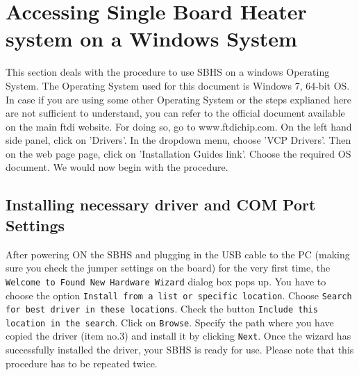 \documentclass[12pt]{report}
\begin{document}
\section{Accessing Single Board Heater system on a Windows System}
\label{win_procedure}
This section deals with the procedure to use SBHS on a windows Operating System. The Operating System used for this document is Windows 7, 64-bit OS. In case if you are using some other Operating System or the steps explianed here are not sufficient to understand, you can refer to the official document available on  the main ftdi website. For doing so, go to www.ftdichip.com. On the left hand side panel, click on 'Drivers'. In the dropdown menu, choose 'VCP Drivers'. Then on the web page page, click on 'Installation Guides link'. Choose the required OS document. We would now begin with the procedure.
\subsection{Installing necessary driver and COM Port Settings}
After powering ON the SBHS and plugging in the USB cable to the PC (making sure you check the jumper settings on the board) for the very first time, the {\tt Welcome to Found New Hardware Wizard} dialog box pops up. You have to choose the option {\tt Install from a list or specific location}. Choose {\tt Search for best driver in these locations}. Check the button {\tt Include this location in the search}. Click on {\tt Browse}. Specify the path where you have copied the driver (item no.3) and install it by clicking {\tt Next}. Once the wizard has successfully installed the driver, your SBHS is ready for use. Please note that this procedure has to be repeated twice.
\end{document}
